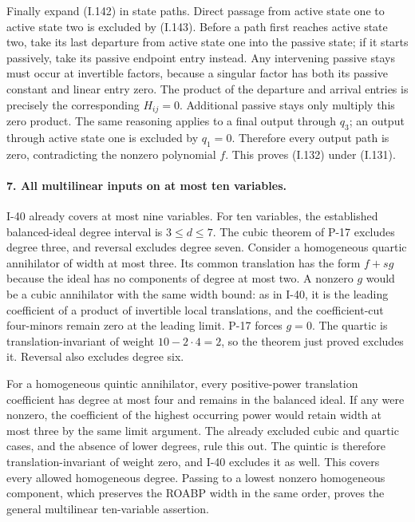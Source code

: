 Finally expand (I.142) in state paths. Direct passage from
active state one to active state two is excluded by (I.143).
Before a path first reaches active state two, take its last
departure from active state one into the passive state; if it
starts passively, take its passive endpoint entry instead.
Any intervening passive stays must occur at invertible factors,
because a singular factor has both its passive constant and
linear entry zero. The product of the departure and arrival
entries is precisely the corresponding $H_{ij}=0$.
Additional passive stays only multiply this zero product.
The same reasoning applies to a final output through $q_3$;
an output through active state one is excluded by $q_1=0$.
Therefore every output path is zero, contradicting the
nonzero polynomial $f$. This proves (I.132) under (I.131).

\paragraph{7. All multilinear inputs on at most ten variables.}
I-40 already covers at most nine variables. For ten variables,
the established balanced-ideal degree interval is $3\le d\le7$.
The cubic theorem of P-17 excludes degree three, and reversal
excludes degree seven. Consider a homogeneous quartic
annihilator of width at most three. Its common translation has
the form $f+s g$ because the ideal has no components of degree
at most two. A nonzero $g$ would be a cubic annihilator with
the same width bound: as in I-40, it is the leading coefficient
of a product of invertible local translations, and the
coefficient-cut four-minors remain zero at the leading limit.
P-17 forces $g=0$. The quartic is translation-invariant of
weight $10-2\cdot4=2$, so the theorem just proved excludes it.
Reversal also excludes degree six.

For a homogeneous quintic annihilator, every positive-power
translation coefficient has degree at most four and remains
in the balanced ideal. If any were nonzero, the coefficient
of the highest occurring power would retain width at most
three by the same limit argument. The already excluded cubic
and quartic cases, and the absence of lower degrees, rule this
out. The quintic is therefore translation-invariant of weight
zero, and I-40 excludes it as well. This covers every allowed
homogeneous degree. Passing to a lowest nonzero homogeneous
component, which preserves the ROABP width in the same order,
proves the general multilinear ten-variable assertion.

